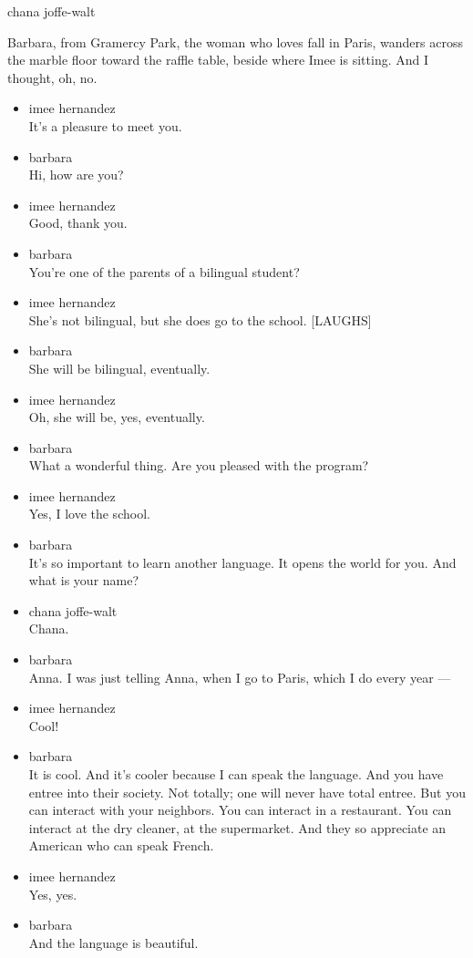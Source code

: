 chana joffe-walt

Barbara, from Gramercy Park, the woman who loves fall in Paris, wanders
across the marble floor toward the raffle table, beside where Imee is
sitting. And I thought, oh, no.

\begin{itemize}
\item
  imee hernandez\\
  It's a pleasure to meet you.
\item
  barbara\\
  Hi, how are you?
\item
  imee hernandez\\
  Good, thank you.
\item
  barbara\\
  You're one of the parents of a bilingual student?
\item
  imee hernandez\\
  She's not bilingual, but she does go to the school. {[}LAUGHS{]}
\item
  barbara\\
  She will be bilingual, eventually.
\item
  imee hernandez\\
  Oh, she will be, yes, eventually.
\item
  barbara\\
  What a wonderful thing. Are you pleased with the program?
\item
  imee hernandez\\
  Yes, I love the school.
\item
  barbara\\
  It's so important to learn another language. It opens the world for
  you. And what is your name?
\item
  chana joffe-walt\\
  Chana.
\item
  barbara\\
  Anna. I was just telling Anna, when I go to Paris, which I do every
  year ---
\item
  imee hernandez\\
  Cool!
\item
  barbara\\
  It is cool. And it's cooler because I can speak the language. And you
  have entree into their society. Not totally; one will never have total
  entree. But you can interact with your neighbors. You can interact in
  a restaurant. You can interact at the dry cleaner, at the supermarket.
  And they so appreciate an American who can speak French.
\item
  imee hernandez\\
  Yes, yes.
\item
  barbara\\
  And the language is beautiful.
\end{itemize}

